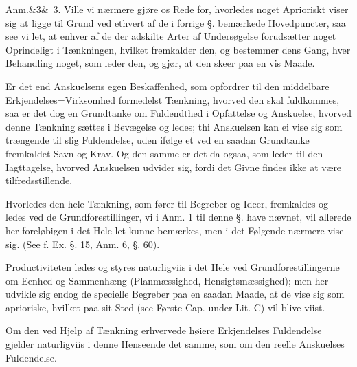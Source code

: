 \documentclass[12pt]{book}
\def\sperr#1{#1}%
\def\textit#1{#1}%
\def\emph#1{#1}%
\newcommand{\sperr}[1]{\textls[180]{#1}}
\newcommand{\anm}[1]{%
  \par\vspace{0.5\baselineskip}%
  \noindent\hspace{\parindent}\sperr{Anm.}\ifx&#1&\else~\textit{#1}.\fi
  \enspace\ignorespaces
}
\newcommand{\opage}[1]{\marginnote{\footnotesize\textit{[#1]}}}
\begin{document}
\anm{3} Ville vi nærmere gjøre os Rede for, hvorledes noget Aprioriskt viser
sig at ligge til Grund ved ethvert af de i forrige §. bemærkede Hovedpuncter,
saa see vi let, at enhver af de der adskilte Arter af Undersøgelse forudsætter
noget Oprindeligt i Tænkningen, hvilket fremkalder den, og bestemmer dens Gang,
hver Behandling noget, som leder den, og gjør, at den skeer paa en vis Maade.

Er det end Anskuelsens egen Beskaffenhed, som opfordrer til den middelbare
Erkjendelses=Virksomhed formedelst Tænkning, hvorved den skal fuldkommes, saa
er det dog en \emph{Grundtanke om Fuldendthed i Opfattelse og Anskuelse},
hvorved denne Tænkning sættes i Bevægelse og ledes; thi Anskuelsen kan ei vise
sig som trængende til slig Fuldendelse, uden ifølge et ved en saadan Grundtanke
fremkaldet Savn og Krav. Og den samme er det da ogsaa, som leder til den
\opage{24} Iagttagelse, hvorved Anskuelsen udvider sig, fordi det Givne findes ikke at
være tilfredsstillende.

Hvorledes den hele Tænkning, som fører til Begreber og Ideer, fremkaldes og
ledes ved de Grundforestillinger, vi i Anm. 1 til denne §. have nævnet, vil
allerede her foreløbigen i det Hele let kunne bemærkes, men i det Følgende
nærmere vise sig. (See f. Ex. §. 15, Anm. 6, §. 60).

\emph{Productiviteten} ledes og styres naturligviis i det Hele ved
Grundforestillingerne om Eenhed og Sammenhæng (Planmæssighed,
Hensigtsmæssighed); men her udvikle sig endog de specielle Begreber paa en
saadan Maade, at de vise sig som aprioriske, hvilket paa sit Sted (see Første
Cap. under Lit. \textit{C}) vil blive viist.

Om den ved Hjelp af Tænkning erhvervede høiere Erkjendelses Fuldendelse gjelder
naturligviis i denne Henseende det samme, som om den reelle Anskuelses
Fuldendelse.
\end{document}
